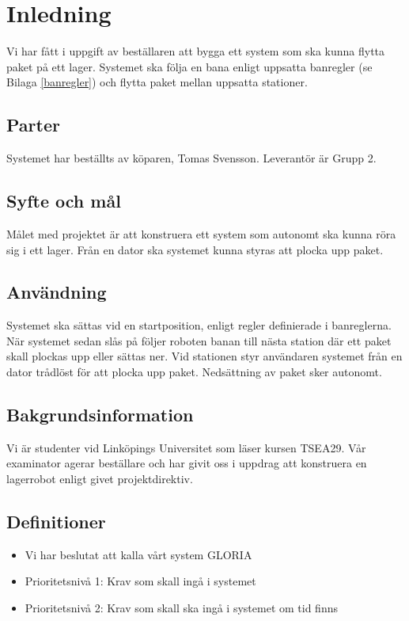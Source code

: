 \section{Inledning}
Vi har fått i uppgift av beställaren att bygga ett system som ska kunna flytta paket på ett lager. Systemet ska följa en bana enligt uppsatta banregler (se Bilaga \ref{banregler}) och flytta paket mellan uppsatta stationer.

\subsection{Parter}
Systemet har beställts av köparen, Tomas Svensson. Leverantör är Grupp 2.

\subsection{Syfte och mål}
Målet med projektet är att konstruera ett system som autonomt ska kunna röra sig i ett lager. Från en dator ska systemet kunna styras att plocka upp paket.

\subsection{Användning}
Systemet ska sättas vid en startposition, enligt regler definierade i banreglerna. När systemet sedan slås på följer roboten banan till nästa station där ett paket skall plockas upp eller sättas ner. Vid stationen styr användaren systemet från en dator trådlöst för att plocka upp paket. Nedsättning av paket sker autonomt.

\subsection{Bakgrundsinformation}
Vi är studenter vid Linköpings Universitet som läser kursen TSEA29. Vår examinator agerar beställare och har givit oss i uppdrag att konstruera en lagerrobot enligt givet projektdirektiv.

\subsection{Definitioner}

\begin{itemize}
\item{Vi har beslutat att kalla vårt system GLORIA}
\item{Prioritetsnivå 1: Krav som skall ingå i systemet}
\item{Prioritetsnivå 2: Krav som skall ska ingå i systemet om tid finns}
\end{itemize}
